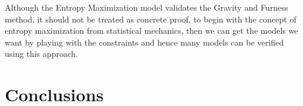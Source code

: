 \documentclass[12pt]{article}
\begin{document}
Although the Entropy Maximization model validates the Gravity and Furness method, it should not be treated as concrete proof, to begin with the concept of entropy maximization from statistical mechanics, then we can get the models we want by playing with the constraints and hence many models can be verified using this approach.







\newpage
\section{Conclusions}
\end{document}
